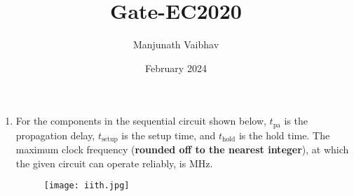 \documentclass{article}
\title{Gate-EC2020}
\author{Manjunath Vaibhav}
\date{February 2024}
\begin{document}
\maketitle
\begin{enumerate}
    \item For the components in the sequential circuit shown below, $t_{\text{pa}}$ is the propagation delay, $t_{\text{setup}}$ is the setup time, and $t_{\text{hold}}$ is the hold time. The maximum clock frequency (\textbf{rounded off to the nearest integer}), at which the given circuit can operate reliably, is \underline{\hspace{1cm}} MHz.
\begin{figure}[h]
  \centering
  \texttt{[image: iith.jpg]} 
\end{figure}

\end{enumerate}
\end{document}
